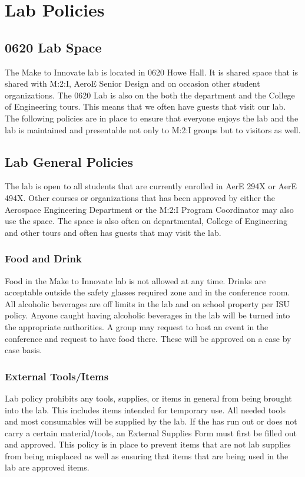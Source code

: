 
\chapter{Lab Policies}

\section{0620 Lab Space}
The Make to Innovate lab is located in 0620 Howe Hall.  It is shared space that is shared with M:2:I, AeroE Senior Design and on occasion other student organizations.  The 0620 Lab is also on the both the department and the College of Engineering tours.  This means that we often have guests that visit our lab.  The following policies are in place to ensure that everyone enjoys the lab and the lab is maintained and presentable not only to M:2:I groups but to visitors as well.

\section{Lab General Policies}
The lab is open to all students that are currently enrolled in AerE 294X or AerE 494X.  Other courses or organizations that has been approved by either the Aerospace Engineering Department or the M:2:I Program Coordinator may also use the space.  The space is also often on departmental, College of Engineering and other tours and often has guests that may visit the lab.

\subsection{Food and Drink}
Food in the Make to Innovate lab is not allowed at any time. Drinks are acceptable outside the safety glasses required zone and in the conference room.  All alcoholic beverages are off limits in the lab and on school property per ISU policy. Anyone caught having alcoholic beverages in the lab will be turned into the appropriate authorities.  A group may request to host an event in the conference and request to have food there.  These will be approved on a case by case basis.

\subsection{External Tools/Items}
Lab policy prohibits any tools, supplies, or items in general from being brought into the lab. This includes items intended for temporary use. All needed tools and most consumables will be supplied by the lab. If the has run out or does not carry a certain material/tools, an External Supplies Form must first be filled out and approved. This policy is in place to prevent items that are not lab supplies from being misplaced as well as ensuring that items that are being used in the lab are approved items. 

